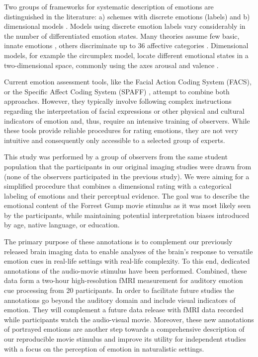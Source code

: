 Two groups of frameworks for systematic description of emotions are
distinguished in the literature: a) schemes with discrete emotions (labels) and
b) dimensional models \cite{GW2007}.  Models using discrete emotion labels vary
considerably in the number of differentiated emotion states. Many theories
assume few basic, innate emotions \cite{Ekm1992a}, others discriminate up to
36 affective categories \cite{Sch2005}.  Dimensional models, for example the
circumplex model, locate different emotional states in a two-dimensional
space, commonly using the axes arousal and valence \cite{Rus1980}.

Current emotion assessment tools, like the Facial Action Coding System (FACS),
or the Specific Affect Coding System (SPAFF) \cite{CG2007}, attempt to combine
both approaches. However, they typically involve following complex instructions
regarding the interpretation of facial expressions or other physical and
cultural indicators of emotion \cite[p. 281]{CG2007} and, thus, require an
intensive training of observers. While these tools provide reliable procedures
for rating emotions, they are not very intuitive and consequently only
accessible to a selected group of experts. 

This study was performed by a group of observers from the same student population
that the participants in our original imaging studies were drawn
from \cite{HBI+14} (none of the observers participated in the previous study). We were aiming for a simplified procedure that combines a dimensional rating with a categorical labeling of emotions and their perceptual evidence.
The goal was to describe the emotional content of the Forrest Gump movie
stimulus as it was most likely seen by the participants, while maintaining
potential interpretation biases introduced by age, native language, or
education.

The primary purpose of these annotations is to complement our previously
released brain imaging data to enable analyses of the brain's response to
versatile emotion cues in real-life settings with real-life complexity. To this
end, dedicated annotations of the audio-movie stimulus have been performed.
Combined, these data form a two-hour high-resolution fMRI measurement for
auditory emotion cue processing from 20 participants. In order to facilitate
future studies the annotations go beyond the auditory domain and include
visual indicators of emotion. They will complement a future data release with
fMRI data recorded while participants watch the audio-visual movie.  Moreover,
these new annotations of portrayed emotions are another step towards a
comprehensive description of our reproducible movie stimulus\cite{HBI+14} and
improve its utility for independent studies with a focus on the perception of
emotion in naturalistic settings.


